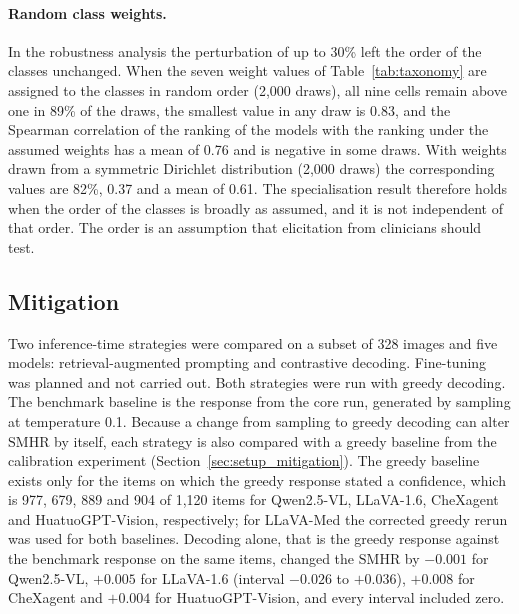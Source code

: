 \documentclass[11pt,a4paper]{article}
\newcommand{\SMHR}{\ensuremath{\mathrm{SMHR}}}
\begin{document}
\paragraph{Random class weights.} In the robustness analysis the perturbation of up to 30\% left the order of the classes unchanged. When the seven weight values of Table~\ref{tab:taxonomy} are assigned to the classes in random order (2{,}000 draws), all nine cells remain above one in 89\% of the draws, the smallest value in any draw is 0.83, and the Spearman correlation of the ranking of the models with the ranking under the assumed weights has a mean of 0.76 and is negative in some draws. With weights drawn from a symmetric Dirichlet distribution (2{,}000 draws) the corresponding values are 82\%, 0.37 and a mean of 0.61. The specialisation result therefore holds when the order of the classes is broadly as assumed, and it is not independent of that order. The order is an assumption that elicitation from clinicians should test.

\subsection{Mitigation}
\label{subsec:res_mitigation}

Two inference-time strategies were compared on a subset of 328 images and five models: retrieval-augmented prompting and contrastive decoding. Fine-tuning was planned and not carried out. Both strategies were run with greedy decoding. The benchmark baseline is the response from the core run, generated by sampling at temperature 0.1. Because a change from sampling to greedy decoding can alter \SMHR{} by itself, each strategy is also compared with a greedy baseline from the calibration experiment (Section~\ref{sec:setup_mitigation}). The greedy baseline exists only for the items on which the greedy response stated a confidence, which is 977, 679, 889 and 904 of 1{,}120 items for Qwen2.5-VL, LLaVA-1.6, CheXagent and HuatuoGPT-Vision, respectively; for LLaVA-Med the corrected greedy rerun was used for both baselines. Decoding alone, that is the greedy response against the benchmark response on the same items, changed the \SMHR{} by $-0.001$ for Qwen2.5-VL, $+0.005$ for LLaVA-1.6 (interval $-0.026$ to $+0.036$), $+0.008$ for CheXagent and $+0.004$ for HuatuoGPT-Vision, and every interval included zero.
\end{document}
